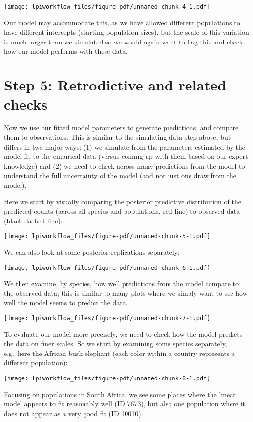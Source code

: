 \documentclass[
  letterpaper,
  DIV=11,
  numbers=noendperiod]{scrartcl}
\begin{document}
\texttt{[image: lpiworkflow\_files/figure-pdf/unnamed-chunk-4-1.pdf]}

Our model may accommodate this, as we have allowed different populations
to have different intercepts (starting population sizes), but the scale
of this variation is much larger than we simulated so we would again
want to flag this and check how our model performs with these data.

\section{Step 5: Retrodictive and related
checks}\label{step-5-retrodictive-and-related-checks}

Now we use our fitted model parameters to generate predictions, and
compare them to observations. This is similar to the simulating data
step above, but differs in two major ways: (1) we simulate from the
parameters estimated by the model fit to the empirical data (versus
coming up with them based on our expert knowledge) and (2) we need to
check across many predictions from the model to understand the full
uncertainty of the model (and not just one draw from the model).

Here we start by visually comparing the posterior predictive
distribution of the predicted counts (across all species and
populations, red line) to observed data (black dashed line):

\texttt{[image: lpiworkflow\_files/figure-pdf/unnamed-chunk-5-1.pdf]}

We can also look at some posterior replications separately:

\texttt{[image: lpiworkflow\_files/figure-pdf/unnamed-chunk-6-1.pdf]}

We then examine, by species, how well predictions from the model compare
to the observed data; this is similar to many plots where we simply want
to see how well the model seems to predict the data.

\texttt{[image: lpiworkflow\_files/figure-pdf/unnamed-chunk-7-1.pdf]}

To evaluate our model more precisely, we need to check how the model
predicts the data on finer scales. So we start by examining some species
separately, e.g.~here the African bush elephant (each color within a
country represents a different population):

\texttt{[image: lpiworkflow\_files/figure-pdf/unnamed-chunk-8-1.pdf]}

Focusing on populations in South Africa, we see some places where the
linear model appears to fit reasonably well (ID 7673), but also one
population where it does not appear as a very good fit (ID 10010).
\end{document}

